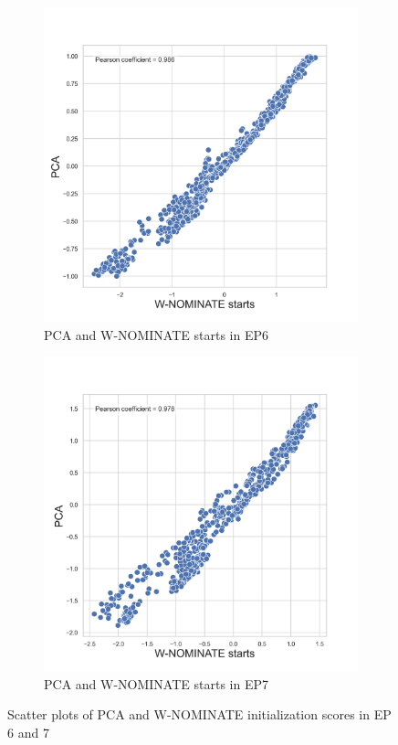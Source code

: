 \documentclass[a4paper,12pt]{report}
\begin{document}
    \begin{figure}[H]
        \centering
        \begin{subfigure}[b]{0.48\textwidth}
            \centering
            \includegraphics[width=\textwidth]{Graphs/Scatterstartspca6}
            \caption{PCA and W-NOMINATE starts in EP6}
            \label{fig:pca_SCATTER_6}
        \end{subfigure}
        \hfill
        \begin{subfigure}[b]{0.48\textwidth}
            \centering
            \includegraphics[width=\textwidth]{Graphs/Scatterstartspca7}
            \caption{PCA and W-NOMINATE starts in EP7}
            \label{fig:pca_SCATTER_7}
        \end{subfigure}
        \caption
        {Scatter plots of PCA and W-NOMINATE initialization scores in EP 6 and 7}
        \label{fig:pca_scatter67}
    \end{figure}
\end{document}
